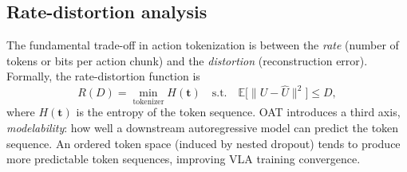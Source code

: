 \documentclass[11pt]{article}
\begin{document}
\begin{table}[htbp]
\centering
\caption{\textbf{Empirical benchmark results.} Measured on 50 synthetic DHB invariant sequences ($T=50$, $D=8$). Compression ratio is defined as $(T \times D) / \text{num\_tokens}$. Latency is wall-clock encode+decode time per chunk on CPU. Codebook utilization (CB Util) is the fraction of codebook entries used; ``---'' indicates the method has no discrete codebook.}
\label{tab:benchmark_results}
\end{table}

\subsection{Rate-distortion analysis}

The fundamental trade-off in action tokenization is between the \emph{rate} (number of tokens or bits per action chunk) and the \emph{distortion} (reconstruction error). Formally, the rate-distortion function is
\begin{equation}
  R(D) = \min_{\mathrm{tokenizer}} H(\bm{t}) \quad \text{s.t.} \quad \mathbb{E}\bigl[\lVert U - \hat U\rVert^2\bigr] \le D,
\end{equation}
where $H(\bm{t})$ is the entropy of the token sequence. OAT \cite{liu2026oat} introduces a third axis, \emph{modelability}: how well a downstream autoregressive model can predict the token sequence. An ordered token space (induced by nested dropout) tends to produce more predictable token sequences, improving VLA training convergence.
\end{document}
